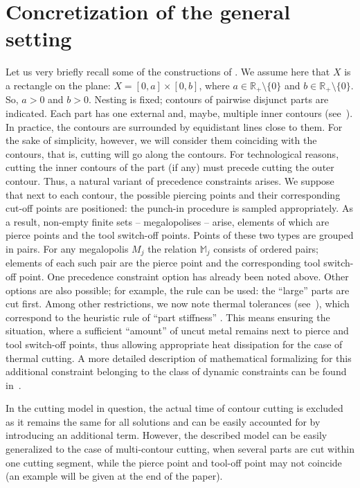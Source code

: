 \documentclass[numbers,sort&compress]{IntechOpen-Book}%
\begin{document}
\section{Concretization of the general setting}
\label{sec:3}

Let us very briefly recall some of the constructions of
\cite [$\S$ 3.3]{4}.
We assume here that $ X $ is a rectangle on the plane:
$X = [0,a] \times [0,b]$,
where
$a \in \mathbb{R}_+ \setminus \{0\}$
and $b \in \mathbb{R}_+ \setminus \{0\}.$
So, $a > 0$ and
$b > 0$.
Nesting is fixed;
contours of pairwise disjunct parts are indicated.
Each part has one external and,
maybe,
multiple inner contours
(see~\cite[\S~3.2]{4}).
In practice,
the contours are surrounded by equidistant lines close to them.
For the sake of simplicity,
however,
we will consider them coinciding with the contours,
that is, cutting will go along the contours.
For technological reasons,
cutting the inner contours of the part
(if any)
must precede cutting the outer contour.
Thus, a natural variant of precedence constraints arises.
We suppose
that next to each contour, the possible
piercing points and their corresponding cut-off points
are positioned:
the punch-in procedure is sampled appropriately.
As a result, non-empty finite sets
-- megalopolises --
arise,
elements of which are pierce points
and the tool switch-off points.
Points of these two types are grouped in pairs.
For any megalopolis
$M_j$
the relation
$\mathbb{M}_j$
consists of ordered pairs;
elements of each such pair are
the pierce point
and the corresponding tool switch-off point.
One precedence constraint option has already been noted above.
Other options are also possible;
for example, the rule can be used: the ``large'' parts are cut first.
Among other restrictions, we now note
thermal tolerances (see~\cite{18}),
which correspond to the heuristic rule of ``part stiffness''
\cite{4}.
This means ensuring the situation,
where
a sufficient ``amount''
of uncut metal remains next to pierce and tool switch-off points, thus allowing appropriate
heat dissipation for the case of thermal cutting.
A more detailed description of mathematical
formalizing for this additional
constraint belonging to the class of dynamic constraints
can be found in~\cite{18}.

In the cutting model in question,
the actual time of contour cutting
is excluded
as it remains the same for all solutions
and can be easily accounted for by introducing an
additional term.
However,
the described model can be easily generalized to
the case of multi-contour cutting,
when
several parts are cut within one cutting segment,
while the pierce point
and tool-off point
may not coincide
(an example will be given at the end
of the paper).
\end{document}
